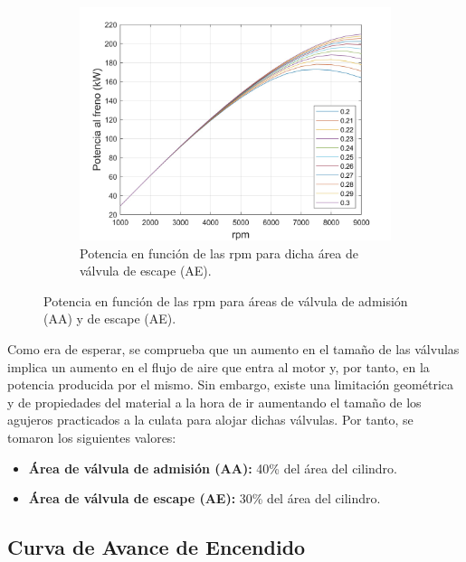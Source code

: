 \begin{figure}[H]
\begin{subfigure}[b]{0.45\textwidth}
        \includegraphics[width=\linewidth]{Figures/01/Potencia_rpm_aval_escape.jpg}
        \caption{Potencia en función de las rpm para dicha área de válvula de escape (AE).}
        \label{fig:RPM_aval_escape}
    \end{subfigure}
    
    \caption{Potencia en función de las rpm para áreas de válvula de admisión (AA) y de escape (AE).}
    \label{fig:RPM_aval_combined}
\end{figure}

Como era de esperar, se comprueba que un aumento en el tamaño de las válvulas implica un aumento en el flujo de aire que entra al motor y, por tanto, en la potencia producida por el mismo. Sin embargo, existe una limitación geométrica y de propiedades del material a la hora de ir aumentando el tamaño de los agujeros practicados a la culata para alojar dichas válvulas. Por tanto, se tomaron los siguientes valores:

\begin{itemize}
   \item \textbf{Área de válvula de admisión (AA):} 40\%  del área del cilindro.
  \item \textbf{Área de válvula de escape (AE):} 30\%  del área del cilindro.
  \end{itemize}
  

\subsection{Curva de Avance de Encendido} \label{s:subsection_03}


